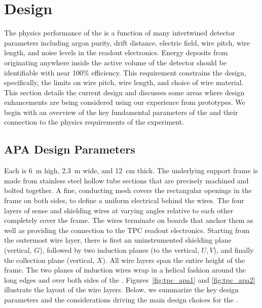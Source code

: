 \section{Design}
\label{sec:fdsp-apa-design}


The physics performance of the  is a function of many intertwined detector parameters including argon purity, drift distance, electric field, wire pitch, wire length, and noise levels in the readout electronics.  Energy deposits from   %
originating anywhere inside the active volume of the detector should be identifiable with near \num{100}\% efficiency.  This requirement constrains the  design, specifically, the limits on wire pitch, wire length, and choice of wire material.  This section details the current %
 design and discusses some areas where design enhancements are being considered using our experience from prototypes.  We begin with an overview of the key fundamental parameters of the  and their connection to the physics requirements of the experiment. 


\subsection{APA Design Parameters}
\label{sec:fdsp-apa-design-overview}


Each  is \SI{6}{m} high, \SI{2.3}{m} wide, and \SI{12}{cm} thick.  The underlying support frame is made from stainless steel hollow tube sections that are precisely machined and bolted together. A fine, conducting mesh covers the rectangular openings in the frame on both sides, to define a uniform electrical  behind the wires. The four layers of sense and shielding wires at varying angles relative to each other completely cover the frame. The wires terminate on boards that anchor them as well as providing the connection to the TPC readout electronics. Starting from the outermost wire layer, there is first an uninstrumented shielding plane (vertical, $G$), followed by two induction planes (\apainducwireangle to the vertical, $U,V$), and finally the collection plane (vertical, $X$). All wire layers span the entire height of the  frame. The two planes of induction wires wrap in a helical fashion around the long edges and over both sides of the . Figures~\ref{fig:tpc_apa1} and \ref{fig:tpc_apa2} illustrate the layout of the wire layers.  Below, we summarize the key design parameters and the considerations driving the main design choices for the .  %

